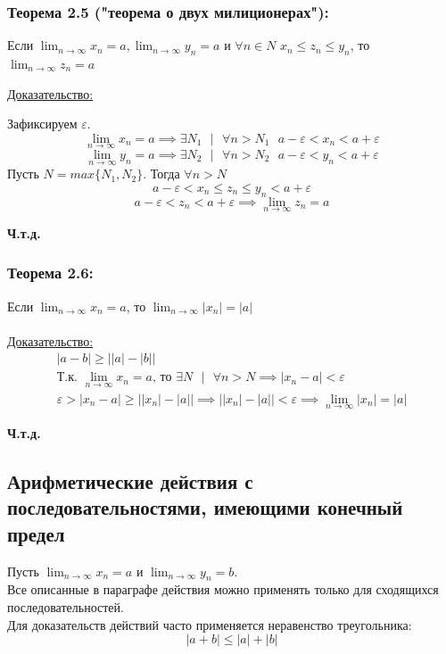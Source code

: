 \documentclass[12pt]{article}
\begin{document}
    \subsubsection*{Теорема 2.5 ("теорема о двух милиционерах"):}
    Если $\lim_{n\to\infty} x_n = a, \lim_{n\to\infty} y_n = a$ и $\forall n \in N$ $x_n \le z_{n} \le y_n$, то $\lim_{n\to\infty} z_{n} = a$\par\noindent
    \underline{Доказательство:}
    \begin{adjustwidth}{1.5em}{1.5em}
        Зафиксируем $\varepsilon$.\\
        \[\lim_{n\to\infty} x_n = a \implies \exists N_{1} \text{ } \big| \text{ } \forall n > N_{1} \text{ } a-\varepsilon < x_n < a + \varepsilon\]
        \[\lim_{n\to\infty} y_n = a \implies \exists N_{2} \text{ } \big| \text{ } \forall n > N_{2} \text{ } a-\varepsilon < y_n < a + \varepsilon\]
        Пусть $N = max\{N_{1}, N_{2}\}$. Тогда $\forall n > N$
        \[a-\varepsilon < x_n \le z_{n} \le y_n < a + \varepsilon\]
        \[a - \varepsilon < z_{n} < a + \varepsilon \implies \lim_{n\to\infty} z_{n} = a\]
        \begin{center}
            \textbf{Ч.т.д.}
        \end{center}
    \end{adjustwidth}

    \subsubsection*{Теорема 2.6:}
    Если $\lim_{n\to\infty} x_n = a$, то $\lim_{n\to\infty} |x_n| = |a|$\\\\
    \underline{Доказательство:} 
    \begin{gather*}
        |a-b| \ge \big||a|-|b|\big|\\
        \text{Т.к. } \lim_{n\to\infty} x_n = a \text{, то } \exists N \text{ } \big| \text{ } \forall n > N \implies |x_n - a| < \varepsilon\\
        \varepsilon > |x_n - a| \ge \big||x_n| - |a|\big| \implies \big||x_n| - |a|\big| < \varepsilon \implies \lim_{n\to\infty}|x_n| = |a|
    \end{gather*}
    \begin{center}
        \textbf{Ч.т.д.}
    \end{center}

    \subsection{Арифметические действия с последовательностями, имеющими конечный предел}
    \noindent Пусть $\lim_{n\to\infty}x_n = a$ и $\lim_{n\to\infty}y_n=b$.\\
    Все описанные в параграфе действия можно применять только для сходящихся последовательностей.\\
    Для доказательств действий часто применяется неравенство треугольника:
    \[|a+b| \le |a| + |b|\]
\end{document}

